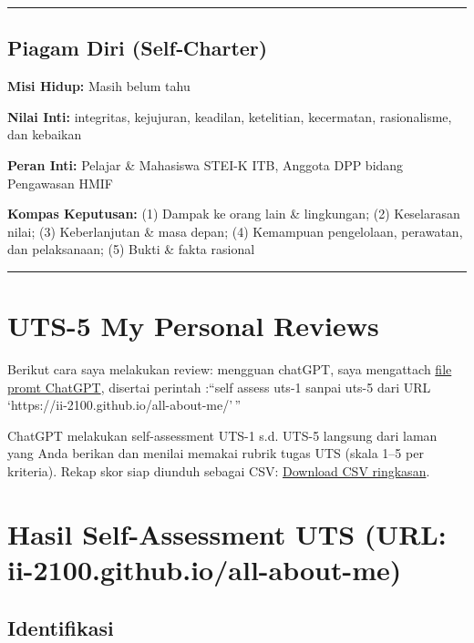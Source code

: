 \documentclass[
  letterpaper,
  DIV=11,
  numbers=noendperiod]{scrreprt}
\begin{document}
\begin{center}\rule{0.5\linewidth}{0.5pt}\end{center}

\section{Piagam Diri (Self‑Charter)}\label{piagam-diri-selfcharter}

\textbf{Misi Hidup:} Masih belum tahu

\textbf{Nilai Inti:} integritas, kejujuran, keadilan, ketelitian,
kecermatan, rasionalisme, dan kebaikan

\textbf{Peran Inti:} Pelajar \& Mahasiswa STEI-K ITB, Anggota DPP bidang
Pengawasan HMIF

\textbf{Kompas Keputusan:} (1) Dampak ke orang lain \& lingkungan; (2)
Keselarasan nilai; (3) Keberlanjutan \& masa depan; (4) Kemampuan
pengelolaan, perawatan, dan pelaksanaan; (5) Bukti \& fakta rasional

\begin{center}\rule{0.5\linewidth}{0.5pt}\end{center}


\chapter{UTS-5 My Personal Reviews}\label{uts-5-my-personal-reviews}

Berikut cara saya melakukan review: mengguan chatGPT, saya mengattach
\href{skor_uts.pdf}{file promt ChatGPT}, disertai perintah :``self
assess uts-1 sanpai uts-5 dari URL
`https://ii-2100.github.io/all-about-me/'\,''

ChatGPT melakukan self-assessment UTS-1 s.d. UTS-5 langsung dari laman
yang Anda berikan dan menilai memakai rubrik tugas UTS (skala 1--5 per
kriteria). Rekap skor siap diunduh sebagai CSV:
\href{sandbox:/mnt/data/UTS_self_assessment.csv}{Download CSV
ringkasan}.


\chapter{Hasil Self-Assessment UTS (URL:
ii-2100.github.io/all-about-me)}\label{hasil-self-assessment-uts-url-ii-2100.github.ioall-about-me}

\section{Identifikasi}\label{identifikasi}
\end{document}
